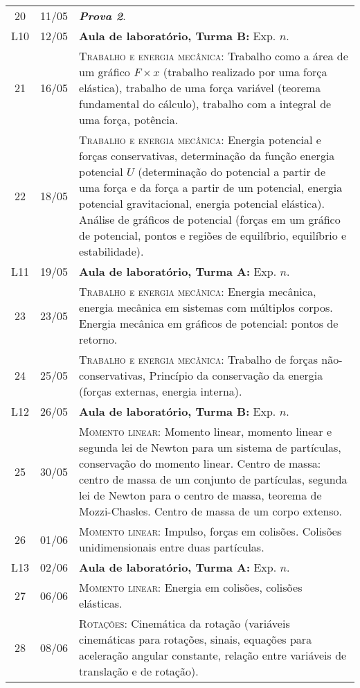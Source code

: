 \begin{center}
\begin{longtable}{ccp{70mm}}
20	 & 	11/05	 & 	\textbf{\textit{Prova 2}}. \\
L10  &  12/05    &  \textbf{Aula de laboratório, Turma B:} Exp. $n$. \\
21	 & 	16/05	 & 	\textsc{Trabalho e energia mecânica:} Trabalho como a área de um gráfico $F \times x$ (trabalho realizado por uma força elástica), trabalho de uma força variável (teorema fundamental do cálculo), trabalho com a integral de uma força, potência. \\
22	 & 	18/05	 & 	\textsc{Trabalho e energia mecânica:} Energia potencial e forças conservativas, determinação da função energia potencial $U$ (determinação do potencial a partir de uma força e da força a partir de um potencial, energia potencial gravitacional, energia potencial elástica). Análise de gráficos de potencial (forças em um gráfico de potencial, pontos e regiões de equilíbrio, equilíbrio e estabilidade).\\
L11  &  19/05    & \textbf{Aula de laboratório, Turma A:} Exp. $n$.\\
23	 & 	23/05	 & 	\textsc{Trabalho e energia mecânica:} Energia mecânica, energia mecânica em sistemas com múltiplos corpos. Energia mecânica em gráficos de potencial: pontos de retorno. \\
24	 & 	25/05	 & 	\textsc{Trabalho e energia mecânica:} Trabalho de forças não-conservativas, Princípio da conservação da energia (forças externas, energia interna). \\
L12  &  26/05    &  \textbf{Aula de laboratório, Turma B:} Exp. $n$.\\
25	 & 	30/05	 & 	\textsc{Momento linear:} Momento linear, momento linear e segunda lei de Newton para um sistema de partículas, conservação do momento linear. Centro de massa: centro de massa de um conjunto de partículas, segunda lei de Newton para o centro de massa, teorema de Mozzi-Chasles. Centro de massa de um corpo extenso.\\
26	 & 	01/06	 & 	\textsc{Momento linear:} Impulso, forças em colisões. Colisões unidimensionais entre duas partículas. \\
L13  &  02/06    &  \textbf{Aula de laboratório, Turma A:} Exp. $n$. \\
27	 & 	06/06	 & 	\textsc{Momento linear:} Energia em colisões, colisões elásticas. \\
28	 & 	08/06	 & 	\textsc{Rotações:} Cinemática da rotação (variáveis cinemáticas para rotações, sinais, equações para aceleração angular constante, relação entre variáveis de translação e de rotação). \\

\end{longtable}
\end{center}
